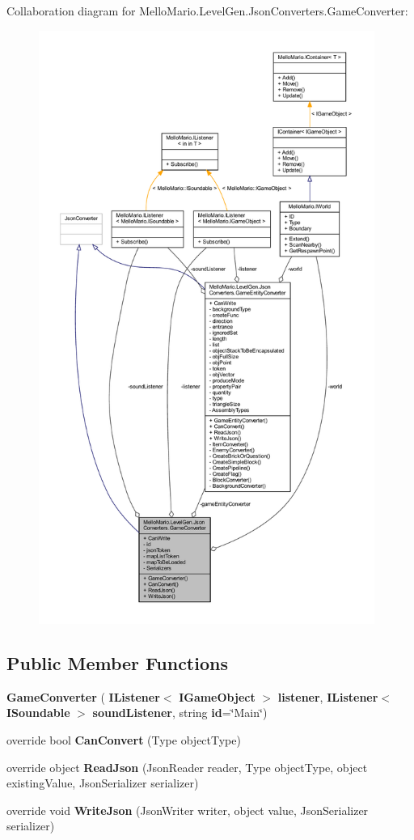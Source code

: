 Collaboration diagram for Mello\+Mario.\+Level\+Gen.\+Json\+Converters.\+Game\+Converter\+:
\nopagebreak
\begin{figure}[H]
\begin{center}
\leavevmode
\includegraphics[height=550pt]{classMelloMario_1_1LevelGen_1_1JsonConverters_1_1GameConverter__coll__graph}
\end{center}
\end{figure}
\subsection*{Public Member Functions}
\begin{DoxyCompactItemize}
\item 
\textbf{ Game\+Converter} (\textbf{ I\+Listener}$<$ \textbf{ I\+Game\+Object} $>$ \textbf{ listener}, \textbf{ I\+Listener}$<$ \textbf{ I\+Soundable} $>$ \textbf{ sound\+Listener}, string \textbf{ id}=\char`\"{}Main\char`\"{})
\item 
override bool \textbf{ Can\+Convert} (Type object\+Type)
\item 
override object \textbf{ Read\+Json} (Json\+Reader reader, Type object\+Type, object existing\+Value, Json\+Serializer serializer)
\item 
override void \textbf{ Write\+Json} (Json\+Writer writer, object value, Json\+Serializer serializer)
\end{DoxyCompactItemize}
